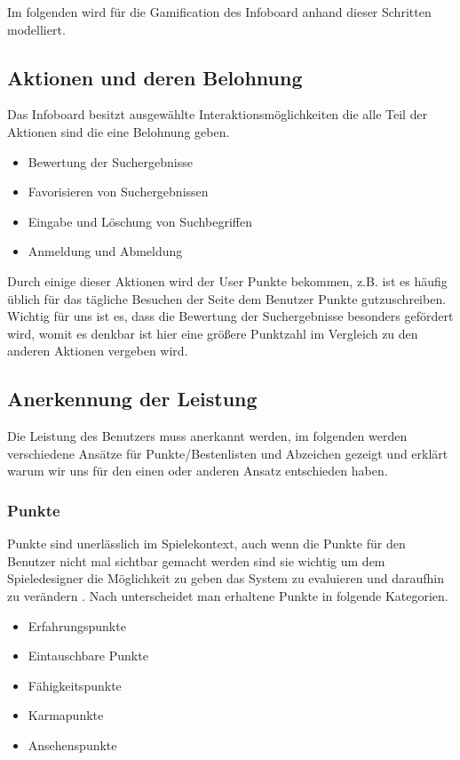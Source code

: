 \documentclass[12pt,twoside]{book}
\begin{document}
Im folgenden wird für die Gamification des Infoboard anhand dieser Schritten modelliert.

\subsection{Aktionen und deren Belohnung}

Das Infoboard besitzt ausgewählte Interaktionsmöglichkeiten die alle Teil der Aktionen sind die eine Belohnung geben.

\begin{itemize}
  \item Bewertung der Suchergebnisse
  \item Favorisieren von Suchergebnissen
  \item Eingabe und Löschung von Suchbegriffen
  \item Anmeldung und Abmeldung
\end{itemize}

Durch einige dieser Aktionen wird der User Punkte bekommen, z.B. ist es häufig üblich für das tägliche Besuchen der Seite dem Benutzer Punkte gutzuschreiben. Wichtig für uns ist es, dass die Bewertung der Suchergebnisse besonders gefördert wird, womit es denkbar ist hier eine größere Punktzahl im Vergleich zu den anderen Aktionen vergeben wird.

\subsection{Anerkennung der Leistung}

Die Leistung des Benutzers muss anerkannt werden, im folgenden werden verschiedene Ansätze für Punkte/Bestenlisten und Abzeichen gezeigt und erklärt warum wir uns für den einen oder anderen Ansatz entschieden haben.

\subsubsection{Punkte}
Punkte sind unerlässlich im Spielekontext, auch wenn die Punkte für den Benutzer nicht mal sichtbar gemacht werden sind sie wichtig um dem Spieledesigner die Möglichkeit zu geben das System zu evaluieren und daraufhin zu verändern \cite{zichermann2011gamification, 36}. Nach \citep{zichermann2011gamification, 38} unterscheidet man erhaltene Punkte in folgende Kategorien.

\begin{itemize}
	\item Erfahrungspunkte
    \item Eintauschbare Punkte
    \item Fähigkeitspunkte
    \item Karmapunkte
    \item Ansehenspunkte
\end{itemize}
\end{document}
